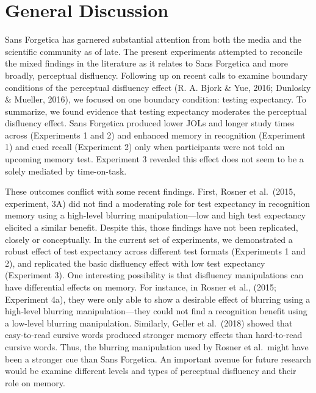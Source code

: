 \documentclass[
  english,
  jou]{apa7}
\begin{document}
\hypertarget{general-discussion}{%
\section{General Discussion}\label{general-discussion}}

Sans Forgetica has garnered substantial attention from both the media and the scientific community as of late. The present experiments attempted to reconcile the mixed findings in the literature as it relates to Sans Forgetica and more broadly, perceptual disfluency. Following up on recent calls to examine boundary conditions of the perceptual disfluency effect (R. A. Bjork \& Yue, 2016; Dunlosky \& Mueller, 2016), we focused on one boundary condition: testing expectancy. To summarize, we found evidence that testing expectancy moderates the perceptual disfluency effect. Sans Forgetica produced lower JOLs and longer study times across (Experiments 1 and 2) and enhanced memory in recognition (Experiment 1) and cued recall (Experiment 2) only when participants were not told an upcoming memory test. Experiment 3 revealed this effect does not seem to be a solely mediated by time-on-task.

These outcomes conflict with some recent findings. First, Rosner et al.~(2015, experiment, 3A) did not find a moderating role for test expectancy in recognition memory using a high-level blurring manipulation---low and high test expectancy elicited a similar benefit. Despite this, those findings have not been replicated, closely or conceptually. In the current set of experiments, we demonstrated a robust effect of test expectancy across different test formats (Experiments 1 and 2), and replicated the basic disfluency effect with low test expectancy (Experiment 3). One interesting possibility is that disfluency manipulations can have differential effects on memory. For instance, in Rosner et al., (2015; Experiment 4a), they were only able to show a desirable effect of blurring using a high-level blurring manipulation---they could not find a recognition benefit using a low-level blurring manipulation. Similarly, Geller et al.~(2018) showed that easy-to-read cursive words produced stronger memory effects than hard-to-read cursive words. Thus, the blurring manipulation used by Rosner et al.~might have been a stronger cue than Sans Forgetica. An important avenue for future research would be examine different levels and types of perceptual disfluency and their role on memory.
\end{document}
